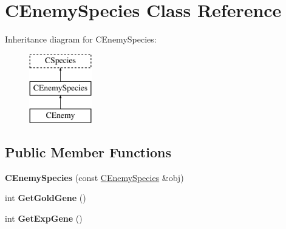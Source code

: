 \hypertarget{class_c_enemy_species}{}\section{C\+Enemy\+Species Class Reference}
\label{class_c_enemy_species}
Inheritance diagram for C\+Enemy\+Species\+:\begin{figure}[H]
\begin{center}
\leavevmode
\includegraphics[height=3.000000cm]{class_c_enemy_species}
\end{center}
\end{figure}
\subsection*{Public Member Functions}
\begin{DoxyCompactItemize}
\item 
{\bfseries C\+Enemy\+Species} (const \hyperlink{class_c_enemy_species}{C\+Enemy\+Species} \&obj)\hypertarget{class_c_enemy_species_a50bb7bb336aefc6ebbc76aa0232261e4}{}\label{class_c_enemy_species_a50bb7bb336aefc6ebbc76aa0232261e4}

\item 
int {\bfseries Get\+Gold\+Gene} ()\hypertarget{class_c_enemy_species_a88758588bd7f6125ae12a4b1ed2a2705}{}\label{class_c_enemy_species_a88758588bd7f6125ae12a4b1ed2a2705}

\item 
int {\bfseries Get\+Exp\+Gene} ()\hypertarget{class_c_enemy_species_a2c160eaf598214093a78302b8c6bc663}{}\label{class_c_enemy_species_a2c160eaf598214093a78302b8c6bc663}

\end{DoxyCompactItemize}
